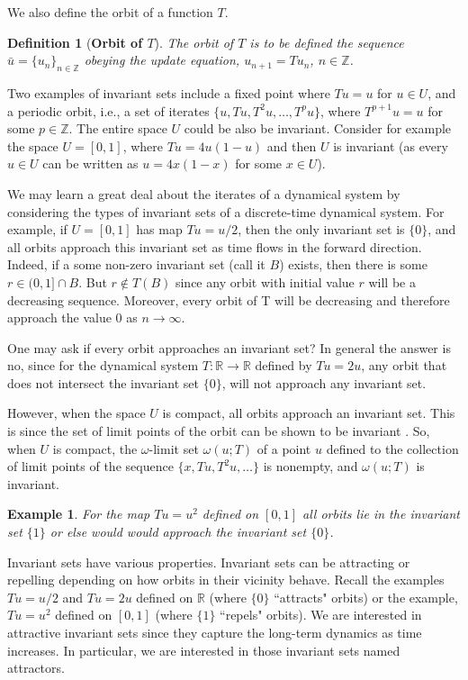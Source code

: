 \documentclass[a4paper,12pt,twoside]{report}
\newtheorem{Definition}{Definition}[]
\newtheorem{Example}{Example}[]
\begin{document}
We also define the orbit of a function $T$.
\begin{Definition}
  [\bf Orbit of $T$]\label{Dfn_Orbit}\rm
  The orbit of $T$ is to be defined the sequence $\bar{u} = \{u_n\}_{n\in \mathbb{Z}}$ obeying the update equation, $u_{n+1}=Tu_n$, $n \in \mathbb{Z}$. 
\end{Definition}

Two examples of invariant sets include a fixed point where $Tu=u$ for  $u\in U$, and a periodic orbit, i.e., a set of iterates $\{u,Tu, T^2u,\ldots,T^pu\}$, where $T^{p+1}u=u$ for some $p\in\mathbb{Z}$.  The entire space $U$ could be also be invariant.
Consider for example the space $U=[0,1]$, where $Tu=4u(1-u)$ and then $U$ is invariant (as every $u\in{U}$ can be written as $u = 4x(1-x)$ for some $x\in{U}$).

We may learn a great deal about the iterates of a dynamical system by considering the types of invariant sets of a discrete-time dynamical system.  For example, if $U=[0,1]$ has map $Tu= u/2$, then the only invariant set is $\{0\}$, and all orbits approach this invariant set as time flows in the forward direction. 
Indeed, if a some non-zero invariant set (call it $B$) exists, then there is  some $r\in(0,1]\cap{B}$. But $r\notin{T(B)}$ since any orbit with initial value $r$ will be a decreasing sequence. Moreover, every orbit of T will be decreasing and therefore approach the value $0$ as $n\rightarrow\infty$.

One may ask if every orbit approaches an invariant set? In general the answer is no, since for the dynamical system $T: \mathbb{R} \to \mathbb{R}$ defined by $Tu=2u$, any orbit that does not intersect the invariant set $\{0\}$, will not approach any invariant set. 

However,  when the space $U$ is compact, all orbits approach an invariant set. This is since the set of limit points of the orbit can be shown to be invariant \cite{de2013elements}. So, when $U$ is compact,  the $\omega$-limit set $\omega(u;T)$ of a point $u$ defined to the collection of limit points of the sequence $\{x,Tu,T^2u,\ldots\}$ is nonempty, and $\omega(u;T)$ is invariant. 

\begin{Example}
  For the map $Tu=u^2$ defined on $[0,1]$ all orbits lie in the invariant set $\{1\}$ or else would would approach the invariant set $\{0\}$. 
\end{Example}


Invariant sets have various properties. Invariant sets can be attracting or repelling depending on how orbits in their vicinity behave. 
Recall the examples $Tu =u/2$ and $Tu=2u$ defined on $\mathbb{R}$ (where $\{0\}$ “attracts" orbits) or the example, $Tu=u^2$ defined on $[0,1]$ (where $\{1\}$ “repels" orbits). 
We are interested in attractive invariant sets since they capture the long-term dynamics as time increases. 
In particular, we are interested in those invariant sets named attractors.
\end{document}
